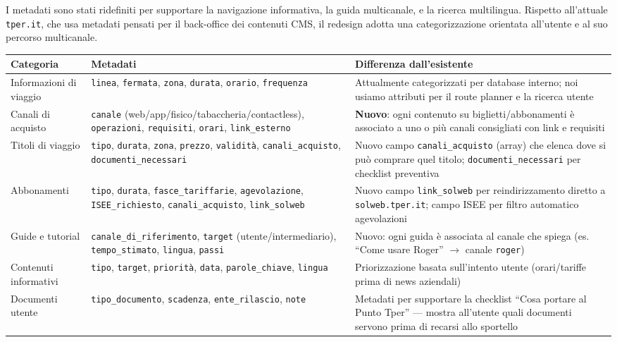 \begin{tcolorbox}[colback=backgroundColor,colframe=borderColor,arc=2mm]
{\small

I metadati sono stati ridefiniti per supportare la navigazione informativa, la guida multicanale, e la ricerca multilingua. Rispetto all'attuale \texttt{tper.it}, che usa metadati pensati per il back-office dei contenuti CMS, il redesign adotta una categorizzazione orientata all'utente e al suo percorso multicanale.

\renewcommand{\arraystretch}{1.2}
\begin{tabular}{|p{3cm}|p{5cm}|p{5cm}|}
\hline
\textbf{Categoria} & \textbf{Metadati} & \textbf{Differenza dall'esistente} \\
\hline
Informazioni di viaggio & \texttt{linea}, \texttt{fermata}, \texttt{zona}, \texttt{durata}, \texttt{orario}, \texttt{frequenza} & Attualmente categorizzati per database interno; noi usiamo attributi per il route planner e la ricerca utente \\
\hline
Canali di acquisto & \texttt{canale} (web/app/fisico/tabaccheria/contactless), \texttt{operazioni}, \texttt{requisiti}, \texttt{orari}, \texttt{link\_esterno} & \textbf{Nuovo}: ogni contenuto su biglietti/abbonamenti è associato a uno o più canali consigliati con link e requisiti \\
\hline
Titoli di viaggio & \texttt{tipo}, \texttt{durata}, \texttt{zona}, \texttt{prezzo}, \texttt{validità}, \texttt{canali\_acquisto}, \texttt{documenti\_necessari} & Nuovo campo \texttt{canali\_acquisto} (array) che elenca dove si può comprare quel titolo; \texttt{documenti\_necessari} per checklist preventiva \\
\hline
Abbonamenti & \texttt{tipo}, \texttt{durata}, \texttt{fasce\_tariffarie}, \texttt{agevolazione}, \texttt{ISEE\_richiesto}, \texttt{canali\_acquisto}, \texttt{link\_solweb} & Nuovo campo \texttt{link\_solweb} per reindirizzamento diretto a \texttt{solweb.tper.it}; campo ISEE per filtro automatico agevolazioni \\
\hline
Guide e tutorial & \texttt{canale\_di\_riferimento}, \texttt{target} (utente/intermediario), \texttt{tempo\_stimato}, \texttt{lingua}, \texttt{passi} & Nuovo: ogni guida è associata al canale che spiega (es. ``Come usare Roger'' $\rightarrow$ canale \texttt{roger}) \\
\hline
Contenuti informativi & \texttt{tipo}, \texttt{target}, \texttt{priorità}, \texttt{data}, \texttt{parole\_chiave}, \texttt{lingua} & Priorizzazione basata sull'intento utente (orari/tariffe prima di news aziendali) \\
\hline
Documenti utente & \texttt{tipo\_documento}, \texttt{scadenza}, \texttt{ente\_rilascio}, \texttt{note} & Metadati per supportare la checklist ``Cosa portare al Punto Tper'' --- mostra all'utente quali documenti servono prima di recarsi allo sportello \\
\hline
\end{tabular}

}
\end{tcolorbox}
